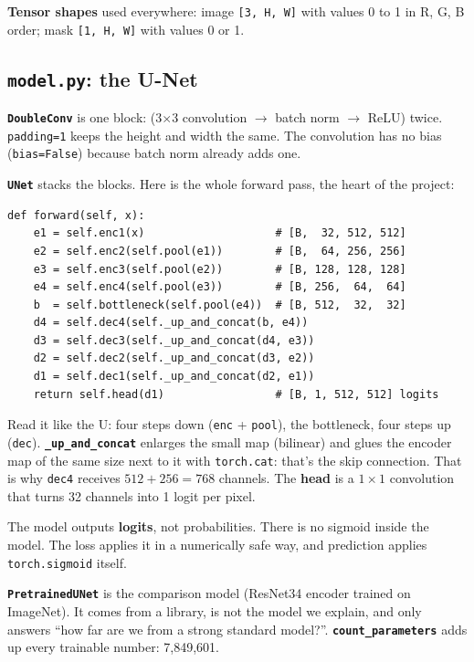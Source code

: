 \textbf{Tensor shapes} used everywhere: image \texttt{[3, H, W]} with values 0 to 1 in R, G, B order; mask \texttt{[1, H, W]} with values 0 or 1.

\subsection{\texttt{model.py}: the U-Net}

\textbf{\texttt{DoubleConv}} is one block: (3$\times$3 convolution $\to$ batch norm $\to$ ReLU) twice. \texttt{padding=1} keeps the height and width the same. The convolution has no bias (\texttt{bias=False}) because batch norm already adds one.

\textbf{\texttt{UNet}} stacks the blocks. Here is the whole forward pass, the heart of the project:
\begin{small}\begin{verbatim}
def forward(self, x):
    e1 = self.enc1(x)                    # [B,  32, 512, 512]
    e2 = self.enc2(self.pool(e1))        # [B,  64, 256, 256]
    e3 = self.enc3(self.pool(e2))        # [B, 128, 128, 128]
    e4 = self.enc4(self.pool(e3))        # [B, 256,  64,  64]
    b  = self.bottleneck(self.pool(e4))  # [B, 512,  32,  32]
    d4 = self.dec4(self._up_and_concat(b, e4))
    d3 = self.dec3(self._up_and_concat(d4, e3))
    d2 = self.dec2(self._up_and_concat(d3, e2))
    d1 = self.dec1(self._up_and_concat(d2, e1))
    return self.head(d1)                 # [B, 1, 512, 512] logits
\end{verbatim}
\end{small}
Read it like the U: four steps down (\texttt{enc} + \texttt{pool}), the bottleneck, four steps up (\texttt{dec}). \textbf{\texttt{\_up\_and\_concat}} enlarges the small map (bilinear) and glues the encoder map of the same size next to it with \texttt{torch.cat}: that's the skip connection. That is why \texttt{dec4} receives $512+256=768$ channels. The \textbf{head} is a $1\times1$ convolution that turns 32 channels into 1 logit per pixel.

\begin{remember}
The model outputs \textbf{logits}, not probabilities. There is no sigmoid inside the model. The loss applies it in a numerically safe way, and prediction applies \texttt{torch.sigmoid} itself.
\end{remember}

\textbf{\texttt{PretrainedUNet}} is the comparison model (ResNet34 encoder trained on ImageNet). It comes from a library, is not the model we explain, and only answers ``how far are we from a strong standard model?''. \textbf{\texttt{count\_parameters}} adds up every trainable number: 7{,}849{,}601.

